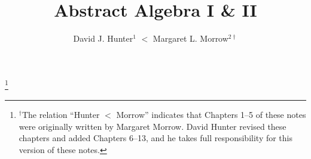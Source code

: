 
%
\usepackage{graphicx}
\usepackage{enumitem}

\usepackage{thmtools}
\theoremstyle{definition}

\usepackage{amscd} %
\usepackage{tikz} %
\usetikzlibrary{shapes.misc}


\newcommand*\notesymbol[1]{\tikz{
            \node[shape=rounded rectangle,fill=yellow!25,draw,inner xsep=2pt, inner ysep=2pt] (char) {#1};}}
\renewcommand{\makeenmark}{\notesymbol{\scriptsize\theenmark}\hspace{3pt}}

\newcommand{\ZZ}{\mathbb{Z}}
\newcommand{\NN}{\mathbb{N}}
\newcommand{\QQ}{\mathbb{Q}}
\newcommand{\RR}{\mathbb{R}}
\newcommand{\CC}{\mathbb{C}}
\newcommand{\FF}{\mathbb{F}}
\DeclareMathOperator{\stab}{stab}
\DeclareMathOperator{\Irr}{Irr}
\DeclareMathOperator{\Gal}{Gal}

%
\InstructorVersion
%
\newcommand\blfootnote[1]{%
  \begingroup
  \renewcommand\thefootnote{}\footnote{#1}%
  \addtocounter{footnote}{-1}%
  \endgroup
}


\large
\frontmatter
\title{Abstract Algebra I \& II}
\author{David J. Hunter$^1$ $<$ Margaret L. Morrow$^{2\dagger}$}
\blfootnote{$^\dagger$The relation ``Hunter $<$ Morrow'' indicates that Chapters 1--5 of these notes were originally written by Margaret Morrow. David Hunter revised these chapters and added Chapters 6--13, and he takes full responsibility for this version of these notes.}
\maketitle


